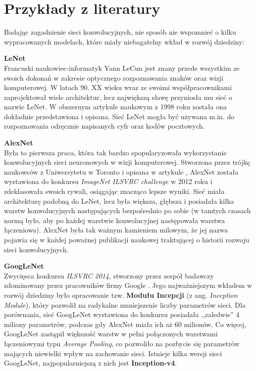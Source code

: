 \section{Przykłady z literatury}
Badając zagadnienie sieci konwolucyjnych, nie sposób nie wspomnieć o kilku wypracowanych modelach, które miały niebagatelny wkład w rozwój dziedziny:
\begin{enumerate*}
\item \textbf{LeNet} \\
Francuski naukowiec-informatyk Yann LeCun jest znany przede wszystkim ze swoich dokonań w zakresie optycznego rozpoznawania znaków oraz wizji komputerowej. W latach 90. XX wieku wraz ze swoimi współpracownikami zaprojektował wiele architektur, lecz największą sławę przyniosła mu sieć o nazwie LeNet. W obszernym artykule naukowym z 1998 roku \cite{lenet:article} została ona dokładnie przedstawiona i opisana. Sieć LeNet mogła być używana m.in. do rozpoznawania odręcznie napisanych cyfr oraz kodów pocztowych.
\item \textbf{AlexNet} \\
Była to pierwsza praca, która tak bardzo spopularyzowała wykorzystanie konwolucyjnych sieci neuronowych w wizji komputerowej. Stworzona przez trójkę naukowców z Uniwersytetu w Toronto i opisana w artykule \cite{alexnet:article}, AlexNet została wystawiona do konkursu \textit{ImageNet ILSVRC challenge} w 2012 roku i zdeklasowała swoich rywali, osiągając znacząco lepsze wyniki. Sieć miała architekturę podobną do LeNet, lecz była większa, głębsza i posiadała kilka warstw konwolucyjnych następujących bezpośrednio po sobie (w tamtych czasach normą było, aby po każdej warstwie konwolucyjnej następowała warstwa łączeniowa). AlexNet była tak ważnym kamieniem milowym, że jej nazwa pojawia się w każdej poważnej publikacji naukowej traktującej o historii rozwoju sieci konwolucyjnych.
\item \textbf{GoogLeNet} \\
Zwycięsca konkursu \textit{ILSVRC 2014}, stworzony przez zespół badawczy zdominowany przez pracowników firmy Google \cite{googlenet:article}. Jego najważniejszym wkładem w rozwój dziedziny było opracowanie tzw. \textbf{Modułu Incepcji} (z ang. \textit{Inception Module}), który pozwolił na radykalne zmniejszenie liczby parametrów sieci. Dla porównania, sieć GoogLeNet wystawiona do konkursu posiadała ,,zaledwie'' 4 miliony parametrów, podczas gdy AlexNet miała ich aż 60 milionów. Co więcej, GoogLeNet zastąpił większość warstw w pełni połączonych warstwami łączeniowymi typu \textit{Average Pooling}, co pozwoliło na pozbycie się parametrów mających niewielki wpływ na zachowanie sieci. Istnieje kilka wersji sieci GoogLeNet, najpopularniejszą z nich jest \textbf{Inception-v4}.

\end{enumerate*}
